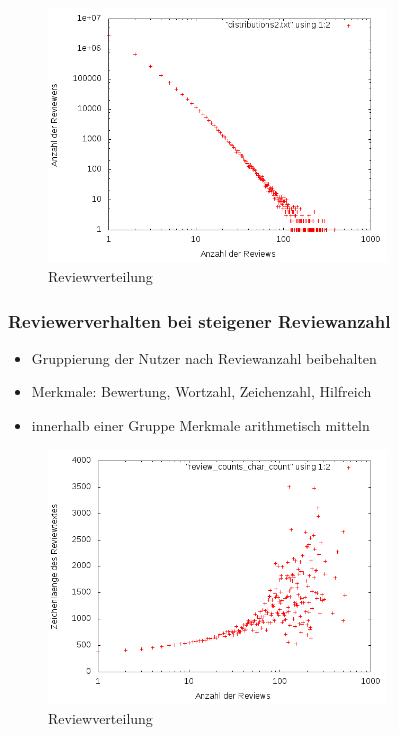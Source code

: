 \documentclass{beamer}
\begin{document}
	\begin{frame}
	\begin{figure}[H]
\centering
    \includegraphics[width=0.8\textwidth]{bild.png}
    \caption{Reviewverteilung}
\end{figure}
	\end{frame}
	
	\begin{frame}
	\frametitle{Reviewerverhalten bei steigener Reviewanzahl}
	\begin{itemize}
	\item Gruppierung der Nutzer nach Reviewanzahl beibehalten
	\item Merkmale: Bewertung, Wortzahl, Zeichenzahl, Hilfreich
	\item innerhalb einer Gruppe Merkmale arithmetisch mitteln
	\end{itemize}
	\end{frame}
	
		\begin{frame}
	\begin{figure}[H]
\centering
    \includegraphics[width=0.8\textwidth]{_results/char_count2.png}
    \caption{Reviewverteilung}
\end{figure}
	\end{frame}
	
\end{document}

